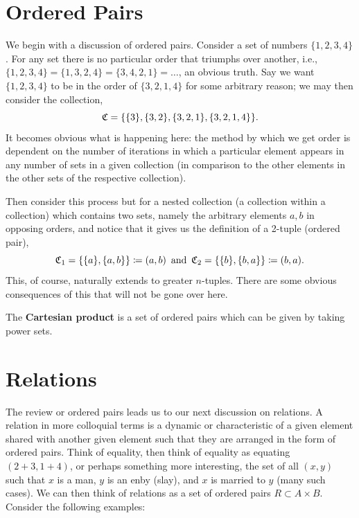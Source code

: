 \documentclass{report}
\begin{document}

\section{Ordered Pairs}
We begin with a discussion of ordered pairs. Consider a set of numbers \(\{1,2,3,4\}\). For any set there is no particular order that triumphs over another, i.e., \(\{1,2,3,4\} = \{1,3,2,4\} = \{3,4,2,1\} =\ldots\), an obvious truth. Say we want \(\{1,2,3,4\}\) to be in the order of \(\{3,2,1,4\}\) for some arbitrary reason; we may then consider the collection,
\[
  \mathfrak{C} = \{\{3\} , \{3,2\} ,\{3,2,1\} , \{3,2,1,4\}     \}
.\]
It becomes obvious what is happening here: the method by which we get order is dependent on the number of iterations in which a particular element appears in any number of sets in a given collection (in comparison to the other elements in the other sets of the respective collection).

Then consider this process but for a nested collection (a collection within a collection) which contains two sets, namely the arbitrary elements \(a,b\) in opposing orders, and notice that it gives us the definition of a 2-tuple (ordered pair),
\[
  \mathfrak{C}_{1} = \{\{a\} ,\{a,b\}   \} \coloneqq (a,b) \, \text{ and }\, \mathfrak{C}_{2}  = \{\{b\} ,\{b,a\}   \} \coloneqq  (b,a)
.\]
This, of course, naturally extends to greater \(n\)-tuples. There are some obvious consequences of this that will not be gone over here.

The \textbf{Cartesian product} is a set of ordered pairs which can be given by taking power sets.

\section{Relations}
The review or ordered pairs leads us to our next discussion on relations. A relation in more colloquial terms is a dynamic or characteristic of a given element shared with another given element such that they are arranged in the form of ordered pairs. Think of equality, then think of equality as equating \((2+3,1+4)\), or perhaps something more interesting, the set of all \((x,y)\) such that \(x\) is a man, \(y\) is an enby (slay), and \(x\) is married to \(y\) (many such cases). We can then think of relations as a set of ordered pairs \(R \subset A\times B\). Consider the following examples:
\end{document}
